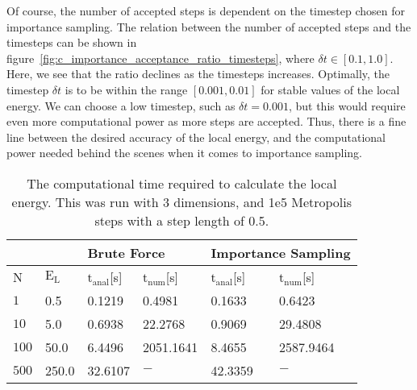 \documentclass[
    a4paper, aps, twocolumn, floatfix, superscriptaddress,
    nofootinbib]{revtex4-1}
\begin{document}
Of course, the number of accepted steps is dependent on the timestep chosen for importance sampling. The relation between the number of accepted steps and the timesteps can be shown in figure~\ref{fig:c_importance_acceptance_ratio_timesteps}, where $\delta t \in [0.1, 1.0]$. Here, we see that the ratio declines as the timesteps increases. Optimally, the timestep $\delta t$ is to be within the range $[0.001, 0.01]$ for stable values of the local energy. We can choose a low timestep, such as $\delta t = 0.001$, but this would require even more computational power as more steps are accepted. Thus, there is a fine line between the desired accuracy of the local energy, and the computational power needed behind the scenes when it comes to importance sampling.


\begin{table}[h!]
 \caption{The computational time required to calculate the local energy. This was run with 3 dimensions, and 1e5 Metropolis steps with a step length of 0.5.}
 \begin{ruledtabular}
    \begin{tabular}{p{0.5cm}p{1.1cm}p{1.1cm}p{1.1cm}p{1.1cm}p{1.1cm}}
    \multirow{2}{*}{} &
     &
      \multicolumn{2}{l}{Brute Force} &
      \multicolumn{2}{l}{Importance Sampling} \\
    \hline
      N & $\text{E}_{\text{L}}$ & $\text{t}_{\text{anal}}$[\si{\second}] & $\text{t}_{\text{num}}$[\si{\second}]& $\text{t}_{\text{anal}}$[\si{\second}] & $\text{t}_{\text{num}}$[\si{\second}] \\
      \hline
 $1$& 0.5 &  0.1219   &  0.4981   & 0.1633  &  0.6423 \\
 $10$& 5.0 & 0.6938   &   22.2768  & 0.9069    &  29.4808 \\
 $100$& 50.0 &  6.4496  & 2051.1641 &   8.4655    &  2587.9464 \\
 $500$& 250.0 & 32.6107  & $ - $  & 42.3359 & $ - $\\
  \end{tabular}
  \end{ruledtabular}
  \label{tab:c_brute_force_vs_importance_tCPU}
\end{table}
\end{document}
